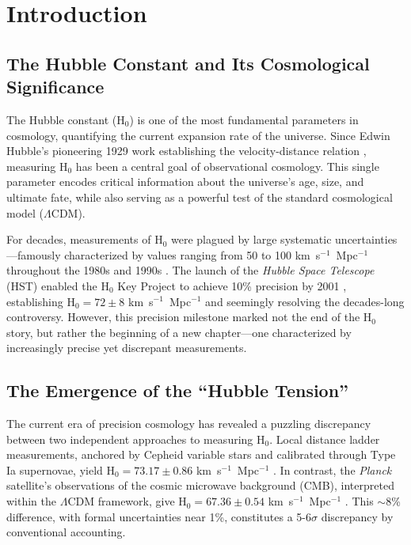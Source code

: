 \documentclass[twocolumn, linenumbers]{aastex701}
\begin{document}


\section{Introduction} \label{sec:intro}

\subsection{The Hubble Constant and Its Cosmological Significance}

The Hubble constant (H$_0$) is one of the most fundamental parameters in cosmology, quantifying the current expansion rate of the universe. Since Edwin Hubble's pioneering 1929 work establishing the velocity-distance relation \citep{Hubble1929}, measuring H$_0$ has been a central goal of observational cosmology. This single parameter encodes critical information about the universe's age, size, and ultimate fate, while also serving as a powerful test of the standard cosmological model ($\Lambda$CDM).

For decades, measurements of H$_0$ were plagued by large systematic uncertainties---famously characterized by values ranging from 50 to 100 km~s$^{-1}$~Mpc$^{-1}$ throughout the 1980s and 1990s \citep{Freedman2001}. The launch of the \textit{Hubble Space Telescope} (HST) enabled the H$_0$ Key Project to achieve 10\% precision by 2001 \citep{Freedman2001}, establishing H$_0 = 72 \pm 8$ km~s$^{-1}$~Mpc$^{-1}$ and seemingly resolving the decades-long controversy. However, this precision milestone marked not the end of the H$_0$ story, but rather the beginning of a new chapter---one characterized by increasingly precise yet discrepant measurements.

\subsection{The Emergence of the ``Hubble Tension''}

The current era of precision cosmology has revealed a puzzling discrepancy between two independent approaches to measuring H$_0$. Local distance ladder measurements, anchored by Cepheid variable stars and calibrated through Type Ia supernovae, yield H$_0 = 73.17 \pm 0.86$ km~s$^{-1}$~Mpc$^{-1}$ \citep{Riess2022}. In contrast, the \textit{Planck} satellite's observations of the cosmic microwave background (CMB), interpreted within the $\Lambda$CDM framework, give H$_0 = 67.36 \pm 0.54$ km~s$^{-1}$~Mpc$^{-1}$ \citep{Planck2018}. This $\sim$8\% difference, with formal uncertainties near 1\%, constitutes a 5-6$\sigma$ discrepancy by conventional accounting.
\end{document}

